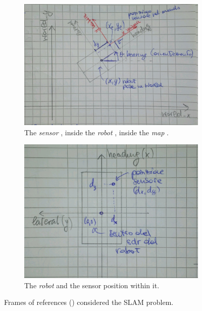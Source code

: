 \begin{figure}
	\centering
	\begin{subfigure}[b]{.58\textwidth}
		\includegraphics[width=\linewidth]{./img/frames_of_reference.png}
		\caption{The \emph{sensor} \FoR{}, inside the \emph{robot} \FoR{}, inside the \emph{map} \FoR{}.}
		\label{fig.fors.nested}
	\end{subfigure}
	\hfill
	\begin{subfigure}[b]{.38\textwidth}
		\includegraphics[width=\linewidth]{./img/robot_for.png}
		\caption{The \emph{robot} \FoR{} and the sensor position within it.}
		\label{fig.fors.robot}
	\end{subfigure}
	\caption{Frames of references (\FoR) considered the SLAM problem.}
	\label{fig.fors}
\end{figure}

